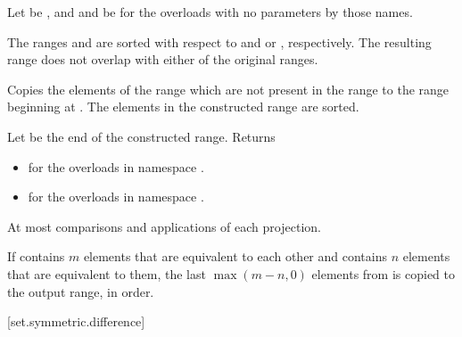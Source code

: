 \begin{itemdescr}
\pnum
Let  be ,
and  and  be 
for the overloads with no parameters by those names.

\pnum
\expects
The ranges  and  are sorted
with respect to  and  or , respectively.
The resulting range does not overlap with either of the original ranges.

\pnum
\effects
Copies the elements of the range 
which are not present in the range 
to the range beginning at .
The elements in the constructed range are sorted.

\pnum
\returns
Let  be the end of the constructed range.
Returns
\begin{itemize}
\item
  for the overloads in namespace .
\item
  for the overloads in namespace .
\end{itemize}

\pnum
\complexity
At most 
comparisons and applications of each projection.

\pnum
\remarks
If  contains $m$ elements
that are equivalent to each other and
 contains $n$ elements
that are equivalent to them,
the last $\max(m - n, 0)$ elements from 
is copied to the output range, in order.
\end{itemdescr}

[set.symmetric.difference]{}

